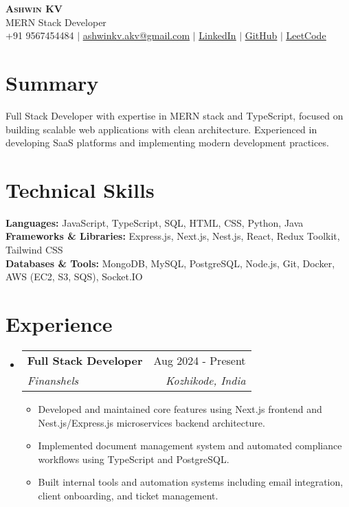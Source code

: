 \documentclass[letterpaper,11pt]{article}
\makeatletter
\newcommand{\resumeItem}[1]{\item\small{#1}}
\newcommand{\resumeSubheading}[4]{
  \vspace{-2pt}\item
    \begin{tabular*}{0.97\textwidth}[t]{l@{\extracolsep{\fill}}r}
      \textbf{#1} & #2 \\
      \textit{\small#3} & \textit{\small #4} \\
    \end{tabular*}\vspace{-8pt}
}
\newcommand{\resumeSubHeadingListStart}{\begin{itemize}[leftmargin=0.15in, label={}]}
\newcommand{\resumeSubHeadingListEnd}{\end{itemize}\vspace{-6pt}}
\newcommand{\resumeItemListStart}{\begin{itemize}}
\newcommand{\resumeItemListEnd}{\end{itemize}\vspace{-6pt}}
\makeatother
\begin{document}
\begin{center}
    \textbf{\Huge \scshape Ashwin KV} \\ \vspace{1pt}
    \small MERN Stack Developer \\
    \faPhone \hspace{1pt} +91 9567454484 $|$ 
    \href{mailto:ashwinkv.akv@gmail.com}{\faEnvelope \hspace{1pt} \color{blue}\underline{ashwinkv.akv@gmail.com}} $|$
    \faLinkedin \hspace{1pt} \href{https://www.linkedin.com/in/ashwin-kv/}{\color{blue}\underline{LinkedIn}} $|$
    \faGithub \href{https://github.com/dreamographer}{\color{blue}\underline{GitHub}} $|$
    \faGlobe \hspace{1pt} \href{https://leetcode.com/u/Ashwin_K_V/}{\color{blue}\underline{LeetCode}}
\end{center}

\vspace{-8pt}

\section{Summary}
Full Stack Developer with expertise in MERN stack and TypeScript, focused on building scalable web applications with clean architecture. Experienced in developing SaaS platforms and implementing modern development practices.

\section{Technical Skills}
\begin{itemize}[leftmargin=0.15in, label={}]
    \small{\item{
     \textbf{Languages:} JavaScript, TypeScript, SQL, HTML, CSS, Python, Java \\
     \textbf{Frameworks \& Libraries:} Express.js, Next.js, Nest.js, React, Redux Toolkit, Tailwind CSS \\
     \textbf{Databases \& Tools:} MongoDB, MySQL, PostgreSQL, Node.js, Git, Docker, AWS (EC2, S3, SQS), Socket.IO
    }}
\end{itemize}

\section{Experience}
\resumeSubHeadingListStart
\resumeSubheading
{Full Stack Developer}{Aug 2024 - Present}
{Finanshels}{Kozhikode, India}
\resumeItemListStart
\resumeItem{Developed and maintained core features using Next.js frontend and Nest.js/Express.js microservices backend architecture.}
\resumeItem{Implemented document management system and automated compliance workflows using TypeScript and PostgreSQL.}
\resumeItem{Built internal tools and automation systems including email integration, client onboarding, and ticket management.}
\resumeItemListEnd
\resumeSubHeadingListEnd
\end{document}
